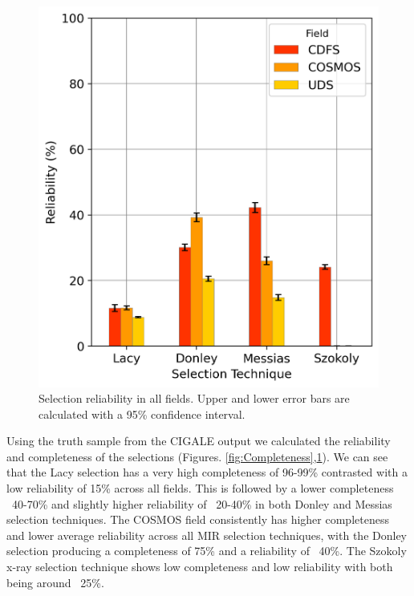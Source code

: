 \documentclass[11pt]{iopart}
\begin{document}
\begin{figure}
  \centering
  \includegraphics[width=0.90\linewidth]{plots/TechniqueReliability.png}
  \caption{Selection reliability in all fields. Upper and lower error bars are calculated with a 95\% confidence interval.}
  \label{fig:Reliability}
\end{figure}
\newpage
Using the truth sample from the CIGALE output we calculated the reliability and completeness of the selections (Figures. \ref{fig:Completeness},\ref{fig:Reliability}). We can see that the Lacy selection has a very high completeness of 96-99\% contrasted with a low reliability of 15\% across all fields. This is followed by a lower completeness ~40-70\% and slightly higher reliability of ~20-40\% in both Donley and Messias selection techniques. The COSMOS field consistently has higher completeness and lower average reliability across all MIR selection techniques, with the Donley selection producing a completeness of 75\% and a reliability of ~40\%. The Szokoly x-ray selection technique shows low completeness and low reliability with both being around ~25\%. 
\end{document}
